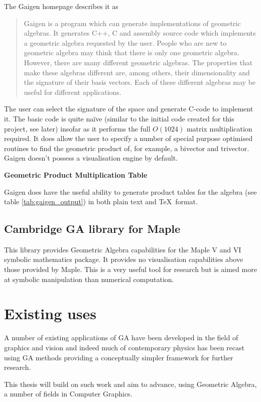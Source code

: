 The Gaigen 
homepage\cite{Gaigen} describes 
it as
\begin{quote}
Gaigen is a program which can generate implementations of geometric algebras. It generates C++, C and assembly source code which implements a geometric algebra requested by the user. People who are new to geometric algebra may think that there is only one geometric algebra. However, there are many different geometric algebras. The properties that make these algebras different are, among others, their dimensionality and the signature of their basis vectors. Each of these different algebras may be useful for different applications.
\end{quote}
The user can select the signature of the space and generate C-code to implement it. The
basic code is quite na\"ive (similar to the initial code created for
this project, see later) insofar as it
performs the full $O(1024)$ matrix multiplication required. It does allow the
user to specify a number of special purpose optimised routines to
find the geometric product of, for example, a bivector and trivector.
Gaigen doesn't possess a visualisation engine by default.

\begin{table}
\centering
\textbf{Geometric Product Multiplication Table}\\
\rule{0cm}{0.3cm}

\caption{Example \TeX\ output from Gaigen\label{tab:gaigen_output}}
\end{table}

Gaigen does have the useful ability to generate product tables for the algebra
(see table \ref{tab:gaigen_output}) in both plain text and \TeX\ format. 


\subsection{Cambridge GA library for Maple}

This library\cite{GA:CambridgeGALibrary} provides Geometric Algebra
capabilities for the Maple V and VI symbolic mathematics package. It provides
no visualisation capabilities above those provided by Maple. This is a very
useful tool for research but is aimed more at symbolic manipulation than
numerical computation.

\section{Existing uses}

A number of existing applications of GA have been developed in the
field of graphics and vision\cite{DBLP:conf/giae/WarehamCL04,SahanLasenby} and
indeed much of contemporary physics has been recast using GA 
methods\cite{DoranLasenby} providing a conceptually simpler
framework for further research.

This thesis will build on such work and aim to advance, using Geometric
Algebra, a number of fields in Computer Graphics.

